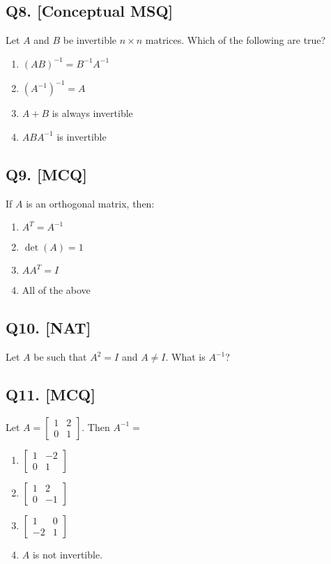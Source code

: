 \subsection*{Q8. [Conceptual MSQ]}
Let $A$ and $B$ be invertible $n \times n$ matrices. Which of the following are true?

\begin{enumerate}[label=(\alph*)]
    \item $(AB)^{-1} = B^{-1}A^{-1}$
    \item $(A^{-1})^{-1} = A$
    \item $A + B$ is always invertible
    \item $ABA^{-1}$ is invertible
\end{enumerate}

\subsection*{Q9. [MCQ]}
If $A$ is an orthogonal matrix, then:

\begin{enumerate}[label=(\alph*)]
    \item $A^T = A^{-1}$
    \item $\det(A) = 1$
    \item $AA^T = I$ 
    \item All of the above
\end{enumerate}

\subsection*{Q10. [NAT]}
Let $A$ be such that $A^2 = I$ and $A \neq I$. What is $A^{-1}$?

\subsection*{Q11. [MCQ]}
Let $A = \begin{bmatrix} 1 & 2 \\ 0 & 1 \end{bmatrix}$. Then $A^{-1} =$

\begin{enumerate}[label=(\alph*)]
    \item $\begin{bmatrix} 1 & -2 \\ 0 & 1 \end{bmatrix}$ 
    \item $\begin{bmatrix} 1 & 2 \\ 0 & -1 \end{bmatrix}$
    \item $\begin{bmatrix} 1 & 0 \\ -2 & 1 \end{bmatrix}$ 
    \item $A$ is not invertible.
\end{enumerate}

